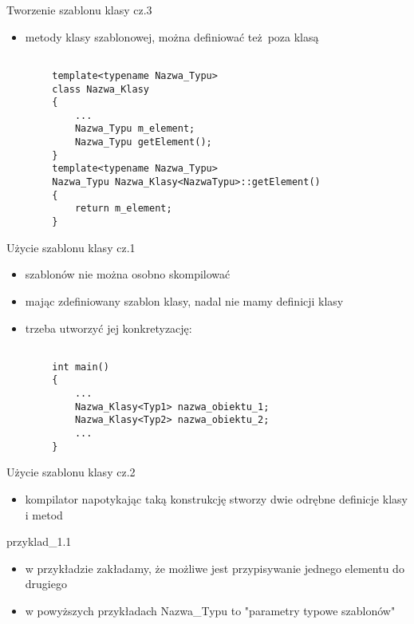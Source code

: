 \documentclass[11pt]{beamer}
\begin{document}
\begin{frame}[fragile]{Tworzenie szablonu klasy cz.3}
	\begin{itemize}
		\item metody klasy szablonowej, można definiować też poza klasą
		\
	\end{itemize}
	
	\begin{lstlisting}[frame=single]  % Start your code-block
		
		template<typename Nazwa_Typu>
		class Nazwa_Klasy
		{
			...
			Nazwa_Typu m_element;
			Nazwa_Typu getElement();
		}
		template<typename Nazwa_Typu>
		Nazwa_Typu Nazwa_Klasy<NazwaTypu>::getElement()
		{
			return m_element;
		}
	\end{lstlisting}
\end{frame}



\begin{frame}[fragile]{Użycie szablonu klasy cz.1}
	\begin{itemize}
		\item szablonów nie można osobno skompilować
		\item mając zdefiniowany szablon klasy, nadal nie mamy definicji klasy
		\item trzeba utworzyć jej konkretyzację:
	\end{itemize}
	
	\begin{lstlisting}[frame=single]  % Start your code-block
		
		int main()
		{
			...
			Nazwa_Klasy<Typ1> nazwa_obiektu_1;	
			Nazwa_Klasy<Typ2> nazwa_obiektu_2;	
			...
		}
		\end{lstlisting}
	
\end{frame}



\begin{frame}[fragile]{Użycie szablonu klasy cz.2}
	\begin{itemize}
		\item kompilator napotykając taką konstrukcję stworzy dwie odrębne definicje klasy i metod
	\end{itemize}
	
	\alert{przyklad\_1.1}
	
	\begin{itemize}
		\item w przykładzie zakładamy, że możliwe jest przypisywanie jednego elementu do drugiego
		
		\item w powyższych przykładach Nazwa\_Typu to "parametry typowe szablonów" 
	\end{itemize}
\end{frame}
\end{document}
